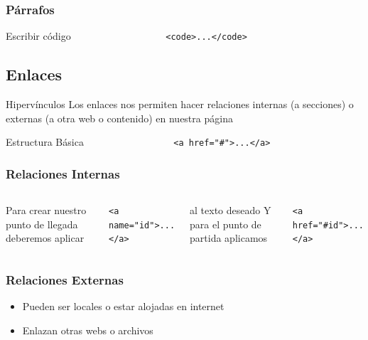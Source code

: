 \documentclass{beamer}
\begin{document}
\begin{frame}[fragile]
\frametitle{Párrafos}
	\begin{block}{Escribir código}
	\verb|                  <code>...</code>|
	\end{block}
\end{frame}
	\subsection{Enlaces}
\begin{frame}[fragile] %
	\begin{block}{Hipervínculos}
	Los enlaces nos permiten hacer relaciones internas (a secciones) o externas (a otra web o contenido) en nuestra página
	\end{block}
	
	\begin{block}{Estructura Básica}
	\verb|                 <a href="#">...</a>|	
	\end{block}
\end{frame}

\begin{frame}[fragile] %
\frametitle{Relaciones Internas}
	\begin{columns}[c]
	Para crear nuestro punto de llegada deberemos aplicar
	\newline
	
	\verb|<a name="id">...</a>|
	\newline
	
	al texto deseado
	\pause
	Y para el punto de partida aplicamos
	\newline
	
	\verb|<a href="#id">...</a>|
	\end{columns}
\end{frame}

\begin{frame} %
\frametitle{Relaciones Externas}
	\begin{itemize}
	\item Pueden ser locales o estar alojadas en internet
	\item Enlazan otras webs o archivos
	\end{itemize}
\end{frame}
\end{document}
